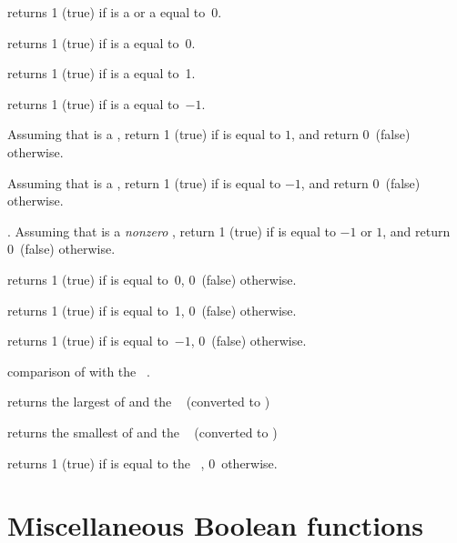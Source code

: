  returns 1 (true) if  is a  or
a  equal to~0.

 returns 1 (true) if  is a 
equal to~0.

 returns 1 (true) if  is a 
equal to~1.

 returns 1 (true) if  is a 
equal to~$-1$.

Assuming that  is a , return 1 (true) if  is equal to
$1$, and return 0~(false) otherwise.

Assuming that  is a , return 1 (true) if  is equal to
$-1$, and return 0~(false) otherwise.

. Assuming that  is a
\emph{nonzero} , return 1 (true) if  is equal to $-1$ or
$1$, and return 0~(false) otherwise.

 returns 1 (true) if  is equal to~0, 0~(false)
otherwise.

 returns 1 (true) if  is equal to~1, 0~(false)
otherwise.

 returns 1 (true) if  is equal to~$-1$,
0~(false) otherwise.



 comparison of  with the
~.


 returns the largest of  and
the ~ (converted to )


 returns the smallest of  and the
~ (converted to )


 returns 1 (true) if  is equal to
the ~, 0~otherwise.

\section{Miscellaneous Boolean functions}

